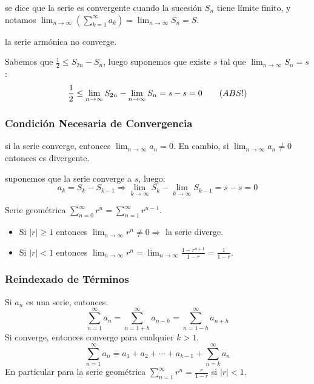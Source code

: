 \Definicion se dice que la serie  es convergente cuando la
sucesión \(S_n\) tiene límite finito, y notamos
\(\ensuremath{\lim_{n \to \infty} (\ensuremath{\sum_{k=1}^\infty a_k})} = \ensuremath{\lim_{n \to \infty} S_n} = S\).

\Ejemplo la serie armónica  no converge.

Sabemos que \(\frac{1}{2} \leq S_{2n} - S_n\), luego suponemos que
existe \(s\) tal que \(\ensuremath{\lim_{n \to \infty} S_n} = s\): \[ 
\frac{1}{2} \leq \ensuremath{\lim_{n \to \infty} S_{2n}} - \ensuremath{\lim_{n \to \infty} S_n} = s - s = 0
\qquad\text(ABS!) 
\]

\hypertarget{condiciuxf3n-necesaria-de-convergencia}{%
\subsubsection{Condición Necesaria de
Convergencia}\label{condiciuxf3n-necesaria-de-convergencia}}

\Teorema si la serie  converge, entonces
\(\ensuremath{\lim_{n \to \infty} a_n} = 0\). En cambio, si
\(\ensuremath{\lim_{n \to \infty} a_n} \neq 0\) entonces  es
divergente.

\Demostracion suponemos que la serie  converge a \(s\),
luego: \[ 
a_k = S_k - S_{k-1} \Rightarrow \ensuremath{\lim_{k \to \infty} S_k} - \ensuremath{\lim_{k \to \infty} S_{k-1}}
= s - s = 0
\]

\Ejemplo Serie geométrica
\(\ensuremath{\sum_{n=0}^\infty r^n} = \ensuremath{\sum_{n=1}^\infty r^{n-1}}\).

\begin{itemize}
\tightlist
\item
  Si \(|r| \geq 1\) entonces
  \(\ensuremath{\lim_{n \to \infty} r^n} \neq 0 \Rightarrow\) la serie
  diverge.
\item
  Si \(|r| < 1\) entonces
  \(\ensuremath{\lim_{n \to \infty} r^n} = \ensuremath{\lim_{n \to \infty} \frac{1-r^{n+1}}{1-r}} = \frac{1}{1-r}\).
\end{itemize}

\hypertarget{reindexado-de-tuxe9rminos}{%
\subsubsection{Reindexado de Términos}\label{reindexado-de-tuxe9rminos}}

Si \(a_n\) es una serie, entonces. \[ 
\ensuremath{\sum_{n=1}^\infty a_n} = \ensuremath{\sum_{n=1+h}^\infty a_{n-h}} = \ensuremath{\sum_{n=1-h}^\infty a_{n+h}}
\] Si  converge, entonces  converge para
cualquier \(k > 1\). \[
\ensuremath{\sum_{n=1}^\infty a_n} = a_1 + a_2 + \cdots + a_{k-1} + \ensuremath{\sum_{n=k}^\infty a_n}
\] En particular para la serie geométrica
\(\ensuremath{\sum_{n=1}^\infty r^n} = \frac{r}{1-r}\) si \(|r| < 1\).

